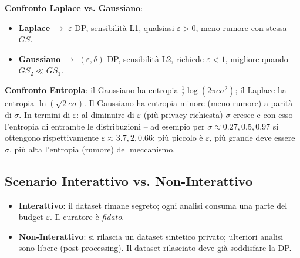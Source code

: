 \documentclass[a4paper,11pt]{article}
\begin{document}
\textbf{Confronto Laplace vs. Gaussiano}:
\begin{itemize}
  \item \textbf{Laplace} $\to$ $\varepsilon$-DP, sensibilit\`{a} L1, qualsiasi $\varepsilon > 0$, meno rumore con stessa $GS$.
  \item \textbf{Gaussiano} $\to$ $(\varepsilon, \delta)$-DP, sensibilit\`{a} L2, richiede $\varepsilon < 1$, migliore quando $GS_2 \ll GS_1$.
\end{itemize}

\textbf{Confronto Entropia}: il Gaussiano ha entropia $\frac{1}{2}\log(2\pi e\sigma^2)$; il Laplace ha entropia $\ln(\sqrt{2}e\sigma)$. Il Gaussiano ha entropia minore (meno rumore) a parit\`{a} di $\sigma$. In termini di $\varepsilon$: al diminuire di $\varepsilon$ (pi\`{u} privacy richiesta) $\sigma$ cresce e con esso l'entropia di entrambe le distribuzioni -- ad esempio per $\sigma \approx 0.27, 0.5, 0.97$ si ottengono rispettivamente $\varepsilon \approx 3.7, 2, 0.66$: pi\`{u} piccolo \`{e} $\varepsilon$, pi\`{u} grande deve essere $\sigma$, pi\`{u} alta l'entropia (rumore) del meccanismo.

\begin{center}
\end{center}

\subsection{Scenario Interattivo vs. Non-Interattivo}

\begin{itemize}
  \item \textbf{Interattivo}: il dataset rimane segreto; ogni analisi consuma una parte del budget $\varepsilon$. Il curatore \`{e} \emph{fidato}.
  \item \textbf{Non-Interattivo}: si rilascia un dataset sintetico privato; ulteriori analisi sono libere (post-processing). Il dataset rilasciato deve gi\`{a} soddisfare la DP.
\end{itemize}
\end{document}

